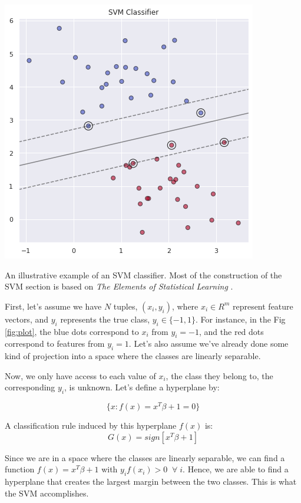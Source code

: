 \documentclass[justified,nobib]{tufte-handout}
\begin{document}
\begin{marginfigure}[3in]
\includegraphics[scale=.4]{./media/svm.png}
\caption{An illustrative example of an SVM classifier. Most of the construction of the SVM section is based on \textit{The Elements of Statistical Learning} \cite{stat}.}
\label{fig:plot}
\end{marginfigure}

First, let's assume we have $N$ tuples, $(x_i, y_i)$, where $x_i \in R^m$ represent feature vectors, and $y_i$ represents the true class, $y_i \in \{-1, 1\}$. For instance, in the Fig \ref{fig:plot}, the blue dots correspond to $x_i$ from $y_i = -1$, and the red dots correspond to features from $y_i = 1$. Let's also assume we've already done some kind of projection into a space where the classes are linearly separable. 

Now, we only have access to each value of $x_i$, the class they belong to, the corresponding $y_i$, is unknown. 
Let's define a hyperplane by: 

\begin{equation}
\{ x: f(x) = x^T\beta + 1 = 0 \}
\end{equation}

A classification rule induced by this hyperplane $f(x)$ is:
\begin{equation}
G(x) = sign[x^T\beta +1 ]
\end{equation}

Since we are in a space where the classes are linearly separable, we can find a function $f(x) = x^T\beta + 1 $ with $y_if(x_i) > 0 \; \; \forall \; i$. Hence, we are able to find a hyperplane that creates the largest margin between the two classes. This is what the SVM accomplishes. 
\end{document}
